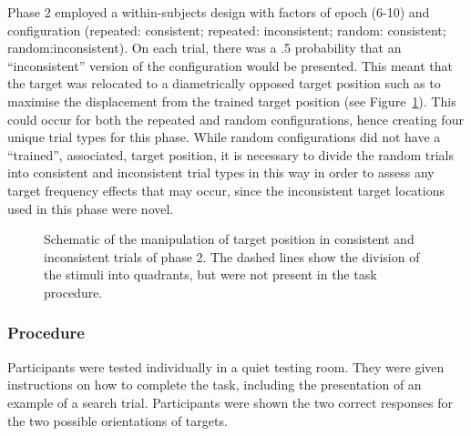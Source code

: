 \documentclass[
  man,
  floatsintext,
  longtable,
  nolmodern,
  notxfonts,
  notimes,
  colorlinks=true,linkcolor=blue,citecolor=blue,urlcolor=blue]{apa7}
\begin{document}
Phase 2 employed a within-subjects design with factors of epoch (6-10)
and configuration (repeated: consistent; repeated: inconsistent; random:
consistent; random:inconsistent). On each trial, there was a .5
probability that an ``inconsistent'' version of the configuration would
be presented. This meant that the target was relocated to a
diametrically opposed target position such as to maximise the
displacement from the trained target position (see
Figure~\ref{fig-schematic}). This could occur for both the repeated and
random configurations, hence creating four unique trial types for this
phase. While random configurations did not have a ``trained'',
associated, target position, it is necessary to divide the random trials
into consistent and inconsistent trial types in this way in order to
assess any target frequency effects that may occur, since the
inconsistent target locations used in this phase were novel.

\begin{figure}[H]


\caption{\label{fig-schematic}Schematic of the manipulation of target
position in consistent and inconsistent trials of phase 2. The dashed
lines show the division of the stimuli into quadrants, but were not
present in the task procedure.}

\end{figure}%

\subsubsection{Procedure}\label{procedure}

Participants were tested individually in a quiet testing room. They were
given instructions on how to complete the task, including the
presentation of an example of a search trial. Participants were shown
the two correct responses for the two possible orientations of targets.
\end{document}
